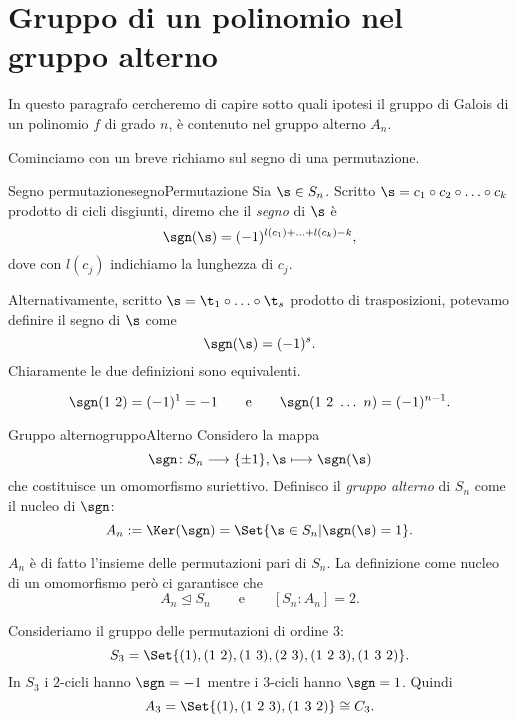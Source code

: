 \section{Gruppo di un polinomio nel gruppo alterno}

In questo paragrafo cercheremo di capire sotto quali ipotesi il gruppo di Galois di un polinomio \(f\) di grado \(n\), è contenuto nel gruppo alterno \(A_n\).

Cominciamo con un breve richiamo sul segno di una permutazione.

\begin{defn}{Segno permutazione}{segnoPermutazione}
	Sia \(\s\in S_n\). Scritto \(\s = c_1\circ c_2 \circ \ldots \circ c_k\) prodotto di cicli disgiunti, diremo che il \emph{segno} di \(\s\) è
	\[
		\sgn(\s) = (-1)^{l(c_1)+\ldots+l(c_k)-k},
	\]
	dove con \(l(c_j)\) indichiamo la lunghezza di \(c_j\).
\end{defn}

\begin{oss}
	Alternativamente, scritto \(\s = \t_1 \circ \ldots \circ \t_s\) prodotto di trasposizioni, potevamo definire il segno di \(\s\) come
	\[
		\sgn(\s) = (-1)^s.
	\]
	Chiaramente le due definizioni sono equivalenti.
\end{oss}

\begin{ese}
	\[
		\sgn(1\ 2) = (-1)^1 = -1 \qquad\text{e}\qquad \sgn(1\ 2\ \ldots\ n) = (-1)^{n-1}.
	\]
\end{ese}

\begin{defn}{Gruppo alterno}{gruppoAlterno}
	Considero la mappa
	\[
		\sgn\colon S_n \longrightarrow \{\pm 1\}, \s \longmapsto \sgn(\s)
	\]
	che costituisce un omomorfismo suriettivo. Definisco il \emph{gruppo alterno} di \(S_n\) come il nucleo di \(\sgn\):
	\[
		A_n:=\Ker(\sgn) = \Set{\s\in S_n | \sgn(\s) = 1}.
	\]
\end{defn}

\begin{oss}
	\(A_n\) è di fatto l'insieme delle permutazioni pari di \(S_n\). La definizione come nucleo di un omomorfismo però ci garantisce che
	\[
		A_n \trianglelefteq S_n \qquad\text{e}\qquad [S_n:A_n] = 2.
	\]
\end{oss}

\begin{ese}
	Consideriamo il gruppo delle permutazioni di ordine \(3\):
	\[
		S_3 = \Set{(1),(1\ 2),(1\ 3),(2\ 3),(1\ 2\ 3),(1\ 3\ 2)}.
	\]
	In \(S_3\) i \(2\)-cicli hanno \(\sgn=-1\) mentre i \(3\)-cicli hanno \(\sgn=1\). Quindi
	\[
		A_3 = \Set{(1),(1\ 2\ 3),(1\ 3\ 2)} \cong C_3.
	\]
\end{ese}

